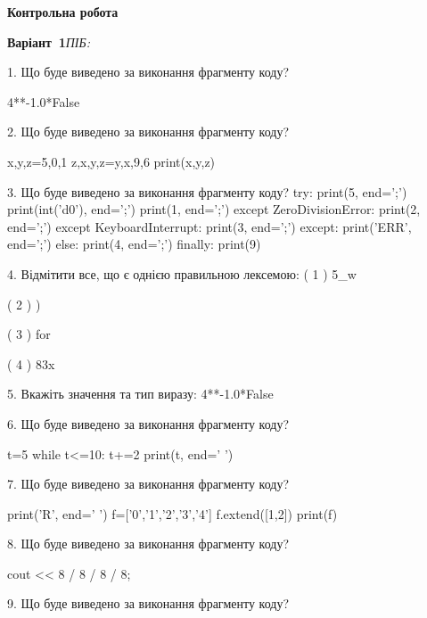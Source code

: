 \documentclass[11pt]{article}
\begin{document}
{\large\textbf{Контрольна робота}}

\textbf{Варіант \No\,1}\hfill \textit{ПІБ:}\,\underline{\hspace{60mm}}
\vspace{4mm}

1. Що буде виведено за виконання фрагменту коду?

4**-1.0*False
\vspace{5mm}

2. Що буде виведено за виконання фрагменту коду?

x,y,z=5,0,1
z,x,y,z=y,x,9,6
print(x,y,z)
\vspace{5mm}

3. Що буде виведено за виконання фрагменту коду?
try:
    print(5, end=';')
    print(int('d0'), end=';')
    print(1, end=';')
except ZeroDivisionError:
    print(2, end=';')
except KeyboardInterrupt:
    print(3, end=';')
except:
    print('ERR', end=';')
else:
    print(4, end=';')
finally:
    print(9)
\vspace{5mm}

4. %
Відмітити все, що є однією правильною лексемою:
( 1 ) 5_w

( 2 ) )

( 3 ) for

( 4 ) 83x
\vspace{5mm}

5. 
Вкажіть значення та тип виразу:
4**-1.0*False
\vspace{5mm}

6. Що буде виведено за виконання фрагменту коду?

t=5
while t<=10:
    t+=2
print(t, end=' ')

\vspace{5mm}

7. Що буде виведено за виконання фрагменту коду?

print('R', end=' ')
f=['0','1','2','3','4']
f.extend([1,2])
print(f)

\vspace{5mm}

8. Що буде виведено за виконання фрагменту коду?

cout << 8 / 8 / 8 / 8;
\vspace{5mm}

9. Що буде виведено за виконання фрагменту коду?
\end{document}
